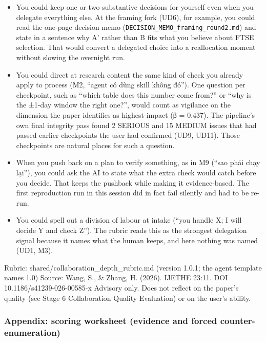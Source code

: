 \documentclass[12pt,a4paper]{article}
\providecommand{\tightlist}{\setlength{\itemsep}{0pt}\setlength{\parskip}{0pt}}
\begin{document}
\begin{itemize}
\tightlist
\item
  You could keep one or two substantive decisions for yourself even when
  you delegate everything else. At the framing fork (UD6), for example,
  you could read the one-page decision memo
  (\texttt{DECISION\_MEMO\_framing\_round2.md}) and state in a sentence
  why A' rather than B fits what you believe about FTSE selection. That
  would convert a delegated choice into a reallocation moment without
  slowing the overnight run.
\item
  You could direct at research content the same kind of check you
  already apply to process (M2, ``agent có dùng skill không đó''). One
  question per checkpoint, such as ``which table does this number come
  from?'' or ``why is the ±1-day window the right one?'', would count as
  vigilance on the dimension the paper identifies as highest-impact (β =
  0.437). The pipeline's own final integrity pass found 2 SERIOUS and 15
  MEDIUM issues that had passed earlier checkpoints the user had
  confirmed (UD9, UD11). Those checkpoints are natural places for such a
  question.
\item
  When you push back on a plan to verify something, as in M9 (``sao phải
  chạy lại''), you could ask the AI to state what the extra check would
  catch before you decide. That keeps the pushback while making it
  evidence-based. The first reproduction run in this session did in fact
  fail silently and had to be re-run.
\item
  You could spell out a division of labour at intake (``you handle X; I
  will decide Y and check Z''). The rubric reads this as the strongest
  delegation signal because it names what the human keeps, and here
  nothing was named (UD1, M3).
\end{itemize}

Rubric: shared/collaboration\_depth\_rubric.md (version 1.0.1; the agent
template names 1.0) Source: Wang, S., \& Zhang, H. (2026). IJETHE 23:11.
DOI 10.1186/s41239-026-00585-x Advisory only. Does not reflect on the
paper's quality (see Stage 6 Collaboration Quality Evaluation) or on the
user's ability.

\hypertarget{appendix-scoring-worksheet-evidence-and-forced-counter-enumeration}{%
\subsubsection{Appendix: scoring worksheet (evidence and forced
counter-enumeration)}\label{appendix-scoring-worksheet-evidence-and-forced-counter-enumeration}}
\end{document}
